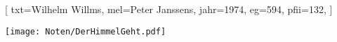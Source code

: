 [
    txt={Wilhelm Willms},
    mel={Peter Janssens},
    jahr={1974},
    eg={594},
	pfii={132},
]

\texttt{[image: Noten/DerHimmelGeht.pdf]}

\endsong
